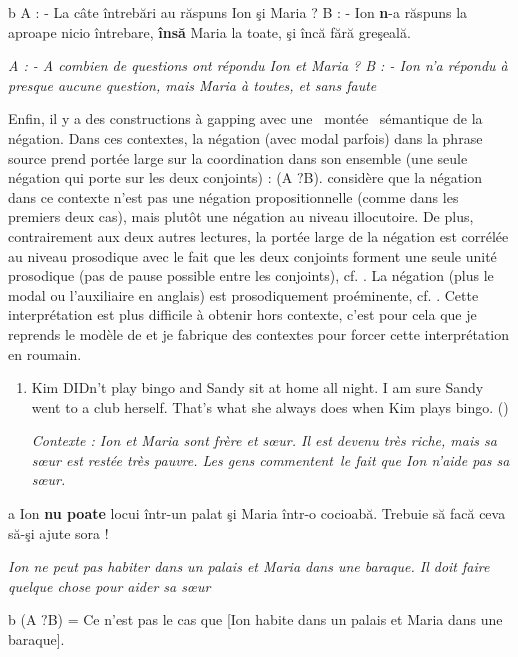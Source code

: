   b  A : - La câte întrebări au răspuns Ion şi Maria ? B : - Ion \textbf{n}-a răspuns la aproape nicio întrebare, \textbf{însă} Maria la toate, şi încă fără greşeală.

{\itshape
A : - A combien de questions ont répondu Ion et Maria ? B : - Ion n'a répondu à presque aucune question, mais Maria à toutes, et sans faute}

Enfin, il y a des constructions à gapping avec une {\guillemotleft}~montée~{\guillemotright} sémantique de la négation. Dans ces contextes, la négation (avec modal parfois) dans la phrase source prend portée large sur la coordination dans son ensemble (une seule négation qui porte sur les deux conjoints) : {\textlnot}(A ${?}$B). \citet{Repp2009} considère que la négation dans ce contexte n'est pas une négation propositionnelle (comme dans les premiers deux cas), mais plutôt une négation au niveau illocutoire. De plus, contrairement aux deux autres lectures, la portée large de la négation est corrélée au niveau prosodique avec le fait que les deux conjoints forment une seule unité prosodique (pas de pause possible entre les conjoints), cf. \citet{Oehrle1987}. La négation (plus le modal ou l'auxiliaire en anglais) est prosodiquement proéminente, cf. \citet{Winkler2005}. Cette interprétation est plus difficile à obtenir hors contexte, c'est pour cela que je reprends le modèle de \citet{Repp2009} et je fabrique des contextes pour forcer cette interprétation en roumain.


\begin{enumerate}
\item Kim DIDn't play bingo and Sandy sit at home all night. I am sure Sandy went to a club herself. That's what she always does when Kim plays bingo.  (\citet[171]{Repp2009})  

\item [\textit{Contexte : Ion et Maria sont frère et s{\oe}ur. Il est devenu très riche, mais sa s{\oe}ur est restée très pauvre. Les gens commentent~le fait que Ion n'aide pas sa s{\oe}ur.}]


\end{enumerate}
  a  Ion \textbf{nu poate} locui într-un palat şi Maria într-o cocioabă. Trebuie să facă ceva să-şi ajute sora !

{\itshape
Ion ne peut pas habiter dans un palais et Maria dans une baraque. Il doit faire quelque chose pour aider sa s{\oe}ur } 

  b  {\textlnot}(A ${?}$B) = Ce n'est pas le cas que [Ion habite dans un palais et Maria dans une baraque].

